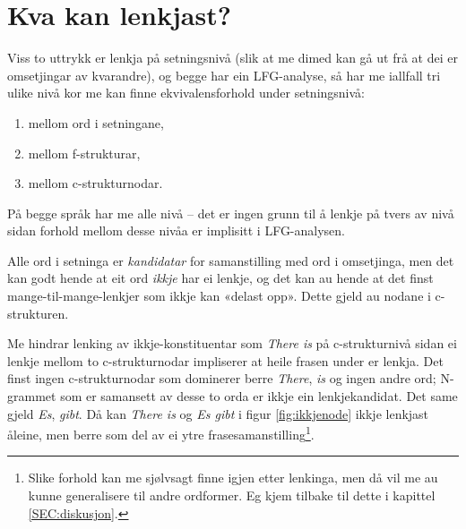 \documentclass[12pt,a4paper,oneside,draft]{report}
\begin{document}
\section{Kva kan lenkjast?}
\label{sec-3.4}

\label{SEC:kandidatar}

Viss to uttrykk er lenkja på setningsnivå (slik at me dimed kan gå
ut frå at dei er omsetjingar av kvarandre), og begge har ein
LFG-analyse, så har me iallfall tri ulike nivå kor me kan finne
ekvivalensforhold under setningsnivå:
\begin{enumerate}
\item mellom ord i setningane,
\item mellom f\hyp{}strukturar,
\item mellom c\hyp{}strukturnodar.
\end{enumerate}
På begge språk har me alle nivå -- det er ingen grunn til å lenkje på
tvers av nivå sidan forhold mellom desse nivåa er implisitt i
LFG-analysen.

Alle ord i setninga er \emph{kandidatar} for samanstilling med ord i
 omsetjinga, men det kan godt hende at eit ord \emph{ikkje} har ei lenkje,
 og det kan au hende at det finst mange-til-mange-lenkjer som ikkje
 kan «delast opp». Dette gjeld au nodane i c\hyp{}strukturen.

Me hindrar lenking av ikkje-konstituentar som \emph{There is} på
 c\hyp{}strukturnivå sidan ei lenkje mellom to c\hyp{}strukturnodar
 impliserer at heile frasen under er lenkja. Det finst ingen
 c\hyp{}strukturnodar som dominerer berre \emph{There}, \emph{is} og ingen andre
 ord; N-grammet som er samansett av desse to orda er ikkje ein
 lenkjekandidat. Det same gjeld \emph{Es}, \emph{gibt}.  Då kan \emph{There is} og
 \emph{Es gibt} i figur \ref{fig:ikkjenode} ikkje lenkjast åleine, men
 berre som del av ei ytre frasesamanstilling\footnote{Slike forhold kan me sjølvsagt finne igjen etter lenkinga,
        men då vil me au kunne generalisere til andre ordformer. Eg
        kjem tilbake til dette i kapittel \ref{SEC:diskusjon}. }.
\end{document}
